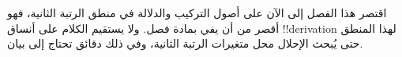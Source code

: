 \documentclass[../../../include/open-logic-chapter]{subfiles}
\begin{document}

\begin{editorial}
اقتصر هذا الفصل إلى الآن على أصول التركيب والدلالة في منطق الرتبة
الثانية، فهو أقصر من أن يفي بمادة فصل. ولا يستقيم الكلام على أنساق
!!{derivation} لهذا المنطق حتى يُبحث الإحلال محل متغيرات الرتبة
الثانية، وفي ذلك دقائق تحتاج إلى بيان.
\end{editorial}







\OLEndChapterHook
\end{document}

